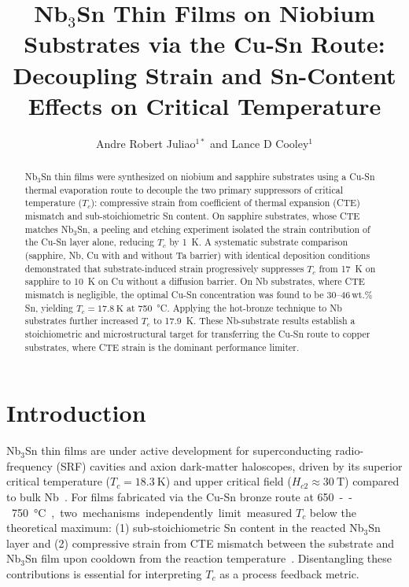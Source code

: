 \documentclass{iopjournal}
\begin{document}

\title{Nb$_3$Sn Thin Films on Niobium Substrates via the Cu-Sn Route: Decoupling Strain and Sn-Content Effects on Critical Temperature}

\author{Andre Robert Juliao$^{1*}$ and Lance D Cooley$^{1}$}





\begin{abstract}
Nb$_3$Sn thin films were synthesized on niobium and sapphire substrates using a Cu-Sn thermal evaporation route to decouple the two primary suppressors of critical temperature ($T_c$): compressive strain from coefficient of thermal expansion (CTE) mismatch and sub-stoichiometric Sn content. On sapphire substrates, whose CTE matches Nb$_3$Sn, a peeling and etching experiment isolated the strain contribution of the Cu-Sn layer alone, reducing $T_c$ by \qty{1}{\kelvin}. A systematic substrate comparison (sapphire, Nb, Cu with and without Ta barrier) with identical deposition conditions demonstrated that substrate-induced strain progressively suppresses $T_c$ from \qty{17}{\kelvin} on sapphire to \qty{10}{\kelvin} on Cu without a diffusion barrier. On Nb substrates, where CTE mismatch is negligible, the optimal Cu-Sn concentration was found to be 30--46\,wt.\%\,Sn, yielding $T_c = \qty{17.8}{\kelvin}$ at \qty{750}{\degreeCelsius}. Applying the hot-bronze technique to Nb substrates further increased $T_c$ to \qty{17.9}{\kelvin}. These Nb-substrate results establish a stoichiometric and microstructural target for transferring the Cu-Sn route to copper substrates, where CTE strain is the dominant performance limiter.
\end{abstract}


\section{Introduction}

Nb$_3$Sn thin films are under active development for superconducting radio-frequency (SRF) cavities and axion dark-matter haloscopes, driven by its superior critical temperature ($T_c = \qty{18.3}{\kelvin}$) and upper critical field ($H_{c2} \approx \qty{30}{\tesla}$) compared to bulk Nb~\cite{gurevichUseNotUse2011}. For films fabricated via the Cu-Sn bronze route at \qty{650}--\qty{750}{\degreeCelsius}, two mechanisms independently limit measured $T_c$ below the theoretical maximum: (1) sub-stoichiometric Sn content in the reacted Nb$_3$Sn layer and (2) compressive strain from CTE mismatch between the substrate and Nb$_3$Sn film upon cooldown from the reaction temperature~\cite{ekinStrainScalingLaw1980, withanageRapidNbSn2021}. Disentangling these contributions is essential for interpreting $T_c$ as a process feedback metric.
\end{document}
